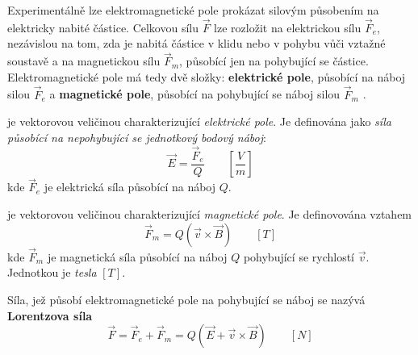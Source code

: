        Experimentálně lze elektromagnetické pole prokázat silovým působením na elektricky nabité
       částice. Celkovou sílu $\vec{F}$ lze rozložit na elektrickou sílu $\vec{F}_e$, nezávislou na
       tom, zda je nabitá částice v klidu nebo v pohybu vůči vztažné soustavě a na magnetickou sílu
       $\vec{F}_m$, působící jen na pohybující se částice. Elektromagnetické pole má tedy dvě
       složky: \textbf{elektrické pole}, působící na náboj silou $\vec{F}_e$ a \textbf{magnetické
       pole}, působící na pohybující se náboj silou $\vec{F}_m$  \cite[s.~13]{Mayer2001}.
      
      \vspace{1em}
       je vektorovou veličinou charakterizující
        \emph{elektrické pole}.
        Je definována jako 
        \emph{síla působící na nepohybující se jednotkový bodový náboj}:
        \begin{equation}\label{TEMP:eq_E}
          \vec{E} = \frac{\vec{F}_e}{Q} \qquad\left[\frac{V}{m}\right]  
        \end{equation}        
        kde $\vec{F}_e$ je elektrická síla působící na náboj $Q$.
      
      \vspace{1em}
       je vektorovou veličinou charakterizující \emph{magnetické
        pole}. Je definovována vztahem
        \begin{equation}\label{TEMP:eq_B}
          \vec{F}_m = Q(\vec{v}\times\vec{B}) \qquad[T]  
        \end{equation}        
        kde $\vec{F}_m$ je magnetická síla působící na náboj $Q$ pohybující se rychlostí $\vec{v}$.
        Jednotkou je \emph{tesla} $[T]$.
    
        Síla, jež působí elektromagnetické pole na pohybující se náboj se nazývá \textbf{Lorentzova
        síla}
        \begin{equation}\label{TEMP:eq_Lorentz}
          \vec{F} = \vec{F}_e + \vec{F}_m =Q(\vec{E} + \vec{v}\times\vec{B}) \qquad[N]  
        \end{equation}        

